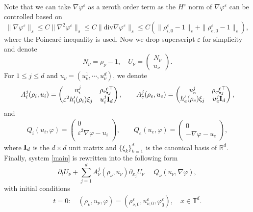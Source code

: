 \documentclass[reqno,twoside,12pt,a4paper]{amsart}
\newcommand{\R}{\mathbb{R}}
\newcommand{\T}{\mathbb{T}}
\newcommand{\eps}{\mathbb{\varepsilon}}
\newcommand{\dive}{\mathrm{div}}
\newcommand{\pt}{\partial_t}
\newcommand{\pa}{\partial}
\newcommand{\D}{\nabla}
\newcommand{\vp}{\varphi}
\numberwithin{equation}{section}
\begin{document}
Note that we can take $\D\vp^\eps$ as a zeroth order term as the $H^s$ norm of $\D\vp^\eps$ can be controlled based on
\[
\|\D\vp^\eps\|_s \leq C\|\D^2\vp^\eps\|_s \leq C\|\dive \D\vp^\eps\|_s\leq C (\|\rho^\eps_{i,0}-1\|_s +\|\rho^\eps_{e,0}-1\|_s),
\]
where the Poincar\'e inequality is used. Now we drop superscript $\eps$ for simplicity and denote
\[
N_\nu= \rho_\nu-1, \quad U_\nu=\left(\begin{matrix}
N_\nu\\
u_\nu\end{matrix}\right).
\]
For $1\leq j\leq d$ and $u_\nu=(u_\nu^1, \cdots, u_\nu^d)$, we denote
\begin{eqnarray*}
A_i^j(\rho_i, u_i)=\left(\begin{matrix}
     u_i^j & \rho_i \xi_j^\top\\
      \eps^2 h_i^\prime(\rho_i) \xi_j & u_i^j \mbox {\bf I}_d\\
     \end{matrix}\right),\qquad
A_e^j(\rho_e, u_e)=\left(\begin{matrix}
      u_e^j & \rho_e \xi_j^\top  \\
      h_e^\prime(\rho_e) \xi_j &   u_e^j \mbox{\bf I}_d \\
    \end{matrix}\right),
\end{eqnarray*}
and
\begin{eqnarray*}
Q_i(u_i,\vp)=\left(\begin{matrix}
                               0 \\
                               \eps^{2}\D\vp-u_i \\
                             \end{matrix}
\right),\qquad
Q_e(u_e,\vp)=\left(\begin{matrix}
                               0 \\
                              -\D\vp-u_e
                              \end{matrix}\right),
\end{eqnarray*}
where ${\bf{I}}_d$ is the $d\times d$ unit matrix and $\{\xi_k\}_{k=1}^d$ is the canonical basis of $\R^d$.  Finally, system \eqref{main} is rewritten into the following form
\begin{equation}\label{startsymmglobal}
  \pt U_\nu+\sum_{j=1}^d A_\nu^j(\rho_\nu, u_\nu)\pa_{x_j}U_\nu=Q_\nu(u_\nu, \D\vp),
\end{equation}
with initial conditions
\begin{eqnarray}\label{startsymmglobalinitial}
t=0: \quad (\rho_\nu,u_\nu, \varphi)=(\rho_{\nu,0}^\eps, u_{\nu,0}^\eps, \varphi_0^\eps), \quad x\in\T^d.
\end{eqnarray}
\end{document}
